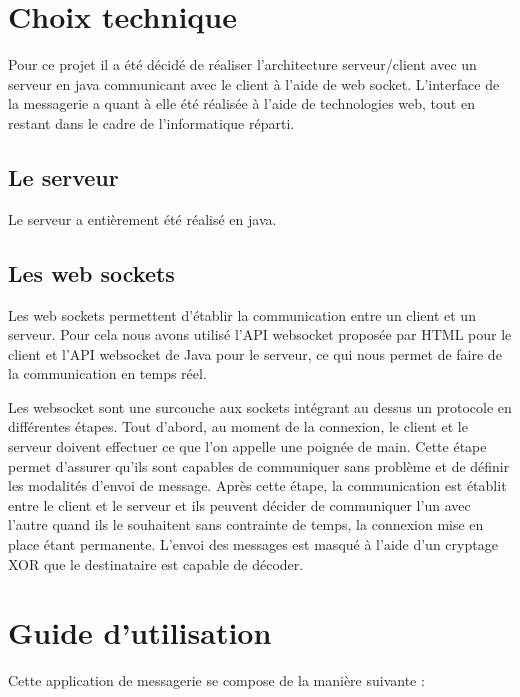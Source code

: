 \section{Choix technique}

\par Pour ce projet il a été décidé de réaliser l'architecture serveur/client avec un serveur en java communicant avec le client à l'aide de web socket. L’interface de la messagerie a quant à elle été réalisée à l'aide de technologies web, tout en restant dans le cadre de l'informatique réparti. 

\subsection{Le serveur}
Le serveur a entièrement été réalisé en java.  

\subsection{Les web sockets}
\par Les web sockets permettent d'établir la communication entre un client et un serveur. Pour cela nous avons utilisé l'API websocket proposée par HTML pour le client 
et l'API websocket de Java pour le serveur, ce qui nous permet de faire de la communication en temps réel.

\par Les websocket sont une surcouche aux sockets intégrant au dessus un protocole en différentes étapes.
Tout d'abord, au moment de la connexion, le client et le serveur doivent effectuer ce que l'on appelle une poignée de main.
Cette étape permet d'assurer qu'ils sont capables de communiquer sans problème et de définir les modalités d'envoi de message.
Après cette étape, la communication est établit entre le client et le serveur et ils peuvent décider de communiquer l'un avec l'autre 
quand ils le souhaitent sans contrainte de temps, la connexion mise en place étant permanente. 
L'envoi des messages est masqué à l'aide d'un cryptage XOR que le destinataire est capable de décoder.

\section{Guide d'utilisation}

\par Cette application de messagerie se compose de la manière suivante : \\

